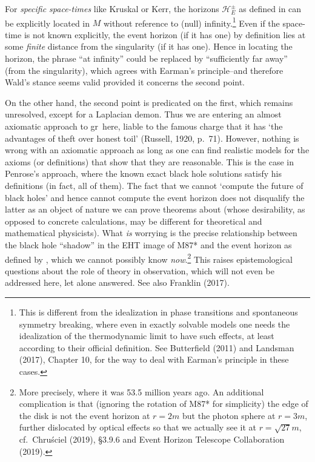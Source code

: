 \documentclass[12pt]{article}
\newcommand{\GR}{{\sc gr}}
\begin{document}
For \emph{specific space-times} like Kruskal or Kerr, the horizons $\mathcal{H}_E^{\pm}$ as defined in  can be explicitly located in $M$ without reference to (null) infinity.\footnote{ 
This is different from the idealization in phase transitions and spontaneous symmetry breaking, where even in exactly solvable models one needs the idealization of the thermodynamic limit to have such effects, at least according to their official  definition. See Butterfield (2011) and Landsman (2017), Chapter 10,  for the way to deal with Earman's principle in these cases.} Even if the space-time is not known explicitly, the event horizon (if it has one) by definition lies at some \emph{finite} distance from the singularity (if it has one). Hence in locating the horizon, the phrase ``at infinity'' could be replaced by ``sufficiently far away'' (from the singularity), which agrees with Earman's principle--and therefore Wald's stance seems valid provided it concerns the second point. 

On the other hand, the second point is predicated on the first, which remains unresolved, except for a Laplacian demon. Thus we are entering an almost axiomatic approach to \GR\ here, liable to the  famous charge that it has `the advantages of theft over honest toil' (Russell, 1920, p.\ 71).
However, nothing is wrong with an axiomatic approach as long as one can find realistic models for the axioms  (or definitions) that show that they are reasonable. This 
 is the case in Penrose's approach, where the known exact black hole solutions satisfy his definitions (in fact, all of them). The fact that we cannot `compute the future of black holes' and hence cannot compute the event horizon does not disqualify the latter as an object of nature we can prove theorems about (whose desirability, as opposed to concrete calculations, may be different for theoretical and mathematical physicists). 
 What \emph{is} worrying is the precise relationship between the black hole ``shadow'' in the  
  EHT image of  M87* and the  event horizon as defined by , which we cannot possibly know \emph{now}.\footnote{More precisely, where it was 53.5 million years ago. An additional complication is that  (ignoring the rotation of M87* for simplicity) the edge of the disk is not the event horizon at $r=2m$ but the photon sphere 
 at $r=3m$, further dislocated by optical effects so that we actually see it at $r=\sqrt{27}m$, cf.\ Chru\'{s}ciel  (2019), \S 3.9.6 and  Event Horizon Telescope Collaboration (2019).
 }  This raises epistemological questions about the role of theory in observation, which will not even be addressed here, let alone answered. See also Franklin (2017). 
\end{document}
